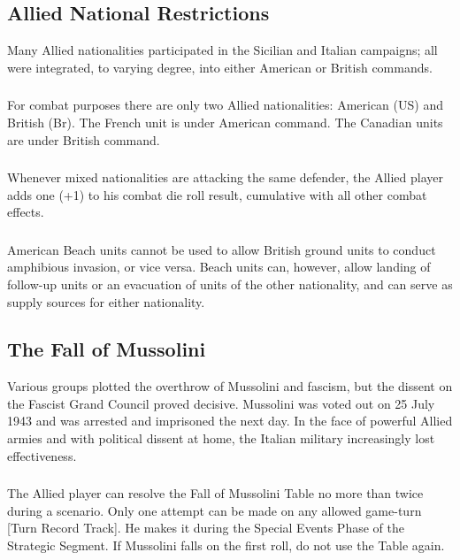 \subsection{Allied National Restrictions}

Many Allied nationalities participated in the Sicilian and Italian campaigns; all were integrated, to varying degree, into either American or British commands.

\subsubsection{} For combat purposes there are only two Allied nationalities: American (US) and British (Br). The French unit is under American command. The Canadian units are under British command.

\subsubsection{} Whenever mixed nationalities are attacking the same defender, the Allied player adds one (+1) to his combat die roll result, cumulative with all other combat effects.

\subsubsection{} American Beach units cannot be used to allow British ground units to conduct amphibious invasion, or vice versa. Beach units can, however, allow landing of follow-up units or an evacuation of units of the other nationality, and can serve as supply sources for either nationality.

\subsection{The Fall of Mussolini}

Various groups plotted the overthrow of Mussolini and fascism, but the dissent on the Fascist Grand Council proved decisive. Mussolini was voted out on 25 July 1943 and was arrested and imprisoned the next day. In the face of powerful Allied armies and with political dissent at home, the Italian military increasingly lost effectiveness.

\subsubsection{}The Allied player can resolve the Fall of Mussolini Table no more than twice during a scenario. Only one attempt can be made on any allowed game-turn [Turn Record Track]. He makes it during the Special Events Phase of the Strategic Segment. If Mussolini falls on the first roll, do not use the Table again.

